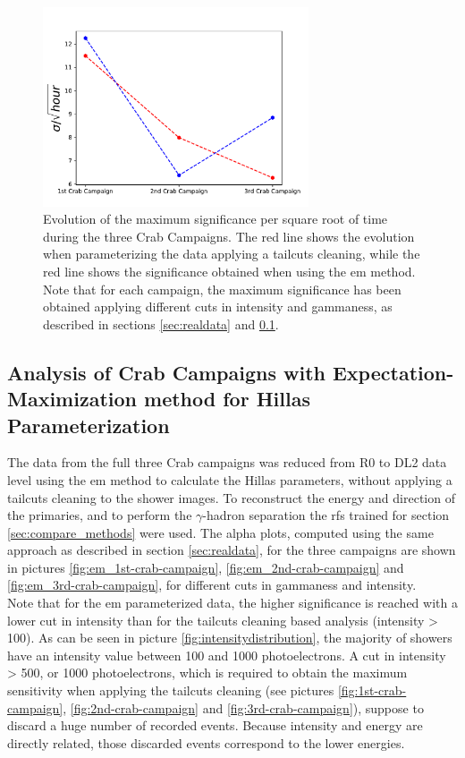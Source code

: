 \documentclass[main.tex]{subfiles}
\begin{document}
\begin{figure}[h!]
  \centering
  \includegraphics[width=0.7\textwidth]{Pictures/total_S.pdf}
  \caption{Evolution of the maximum significance per square root of time during the three Crab Campaigns. The red line shows the evolution when parameterizing the data applying a tailcuts cleaning, while the red line shows the significance obtained when using the \gls{em} method. Note that for each campaign, the maximum significance has been obtained applying different cuts in intensity and gammaness, as described in sections \ref{sec:realdata} and \ref{sec:em-real}.}
  \label{fig:sig_evolution}
\end{figure}

\subsection{Analysis of Crab Campaigns with Expectation-Maximization method for Hillas Parameterization} \label{sec:em-real}

The data from the full three Crab campaigns was reduced from R0 to DL2 data level using the \gls{em} method to calculate the Hillas parameters, without applying a tailcuts cleaning to the shower images. To reconstruct the energy and direction of the primaries, and to perform the $\gamma$-hadron separation the \glspl{rf} trained for section \ref{sec:compare_methods} were used. The alpha plots, computed using the same approach as described in section \ref{sec:realdata}, for the three campaigns are shown in pictures \ref{fig:em_1st-crab-campaign}, \ref{fig:em_2nd-crab-campaign} and \ref{fig:em_3rd-crab-campaign}, for different cuts in gammaness and intensity.\\
Note that for the \gls{em} parameterized data, the higher significance is reached with a lower cut in intensity than for the tailcuts cleaning based analysis (intensity > 100). As can be seen in picture \ref{fig:intensitydistribution}, the majority of showers have an intensity value between 100 and 1000 photoelectrons. A cut in intensity > 500, or 1000 photoelectrons, which is required to obtain the maximum sensitivity when applying the tailcuts cleaning (see pictures \ref{fig:1st-crab-campaign}, \ref{fig:2nd-crab-campaign} and \ref{fig:3rd-crab-campaign}), suppose to discard a huge number of recorded events. Because intensity and energy are directly related, those discarded events correspond to the lower energies.
\end{document}
